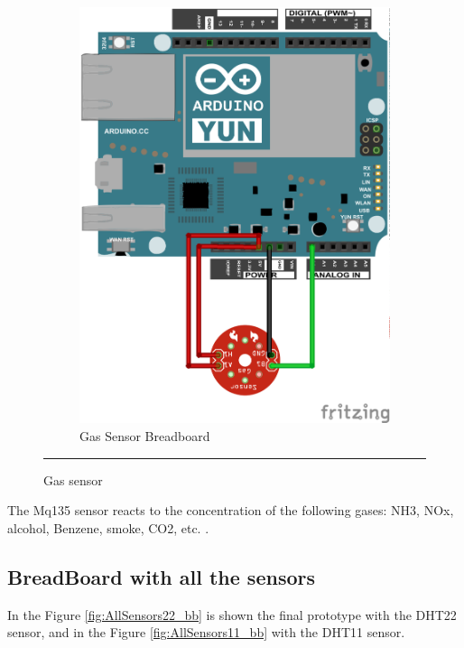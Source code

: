\documentclass[12pt, a4paper,twoside]{tesi_upf}
\begin{document}
\begin{figure}
\begin{subfigure}[b]{0.3\textwidth}
                \includegraphics[width=\textwidth]{./Figures/Fritzing/GasSensor_bb.png}
                \caption{Gas Sensor Breadboard}
                \label{fig:GasSensor_bb}
        \end{subfigure}
        \rule{18em}{0.5pt}
        \caption{Gas sensor}\label{fig:DHT11sensor}
			\end{figure} 
      
      The Mq135 sensor reacts to the concentration of the following gases: NH3, NOx, alcohol, Benzene, smoke, CO2, etc. \cite{mq135gassensor}.
      
    \subsection{BreadBoard with all the sensors}
      
      In the Figure \ref{fig:AllSensors22_bb} is shown the final prototype with the DHT22 sensor, and in the Figure \ref{fig:AllSensors11_bb} with the DHT11 sensor.
      
\end{document}
